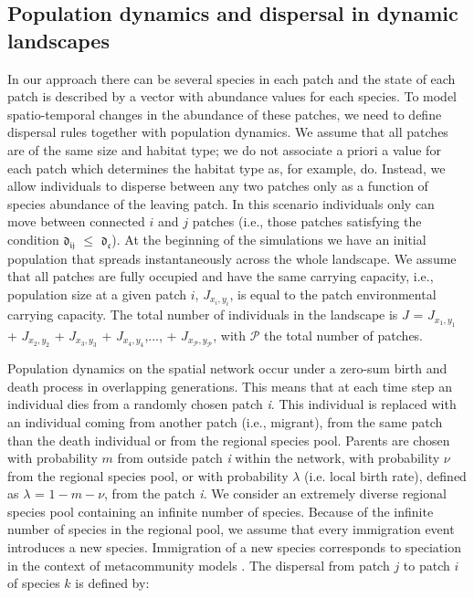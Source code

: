 \documentclass[12pt]{article}
\begin{document}
\subsection*{Population dynamics and dispersal in dynamic landscapes}

In our approach there can be several species in each patch and the state of each patch is described by a vector with abundance values for each species. To model spatio-temporal changes in the abundance of these patches, we need to
define dispersal rules together with population dynamics. We assume that all patches are of the same size and habitat type; we do not associate a priori a value for each patch which determines the habitat type as, for example, \cite{rybickihanski2013} do. Instead, we allow individuals to disperse between any two patches only as a function of species abundance of the leaving patch. In this scenario
individuals only can move between connected $i$ and $j$ patches (i.e., those patches
satisfying the condition $\mathfrak{d_{ij}}$ $\leq$
$\mathfrak{d_{c}}$). At the beginning of the simulations we have an
initial population that spreads instantaneously across the whole
landscape. We assume that all patches are fully occupied and have the
same carrying capacity, i.e., population size at a given patch $i$,
$J_{x_i,y_i}$, is equal to the patch environmental carrying
capacity. The total number of individuals in the landscape is $J$ =
$J_{x_1,y_1}$ + $J_{x_2,y_2}$ + $J_{x_3,y_3}$ + $J_{x_4,y_4}$,..., +
$J_{x_\mathcal{P},y_\mathcal{P}}$, with $\mathcal{P}$ the total number
of patches.

Population dynamics on the spatial network occur under a zero-sum birth and
death process in overlapping generations. This means that at each time step an
individual dies from a randomly chosen patch {\em i}. This individual is
replaced with an individual coming from another patch (i.e., migrant), from the
same patch than the death individual or from the regional species pool. Parents
are chosen with probability $m$ from outside patch {\em i} within the network,
with probability $\nu$ from the regional species pool, or with probability
$\lambda$ (i.e. local birth rate), defined as $\lambda$ = $1 - m - \nu$, from
the patch {\em i}. We consider an extremely diverse regional species pool
containing an infinite number of species. Because of the infinite number of
species in the regional pool, we assume that every immigration event introduces
a new species. Immigration of a new species corresponds to speciation in the
context of metacommunity models \citep{Vanpeteghem&Haegeman:2010}. The
dispersal from patch $j$ to patch $i$ of species $k$ is defined by:
\end{document}
